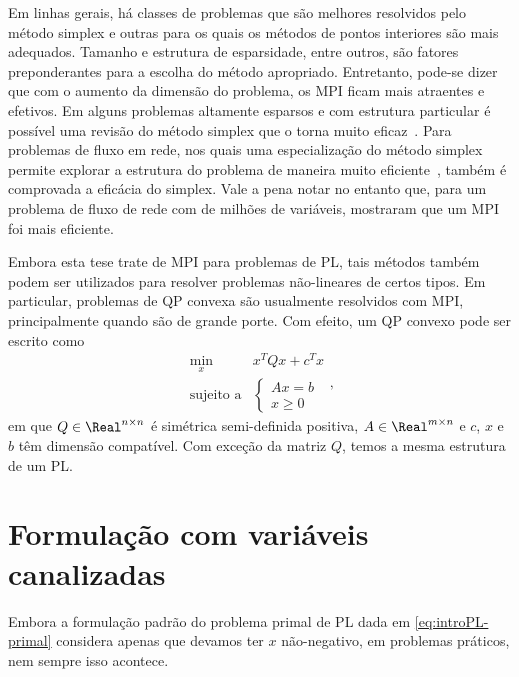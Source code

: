 Em linhas gerais, há classes de problemas que são melhores resolvidos
pelo método simplex e outras para os quais os métodos de pontos interiores são mais
adequados. Tamanho e estrutura de esparsidade, entre outros, são fatores
preponderantes para a escolha do  método apropriado. Entretanto, pode-se dizer
que com o aumento da dimensão do problema, os \ac{MPI} ficam mais atraentes e
efetivos. Em alguns problemas altamente esparsos e com  estrutura particular é possível uma revisão
do método simplex que o torna muito eficaz~\cite{Hall:2005vw}. Para problemas
de fluxo em rede, nos quais uma especialização do método simplex permite
explorar a estrutura do problema de maneira muito
eficiente~\cite{Nemhauser:Integer-and-combinatorial:1988s}, também é comprovada a eficácia do simplex. Vale a pena notar no entanto que, para um problema de fluxo de rede com de milhões de variáveis, 
\textcite{Resende:1993hh} mostraram que um \ac{MPI} foi mais eficiente.



  

Embora esta tese trate de \ac{MPI} para problemas de \ac{PL}, tais
métodos também podem ser utilizados para resolver problemas não-lineares
de certos tipos.
Em particular, problemas de  \ac{QP} convexa
são usualmente resolvidos com \ac{MPI}, principalmente
quando são de grande porte. Com efeito, um \ac{QP} convexo pode ser  escrito como
\begin{equation*}
	\begin{array}{lc}
\displaystyle \min_{x} & x^TQx + c^Tx \\
\text{sujeito a} &\begin{cases} Ax = b \\
				 x \geq 0	
				 \end{cases}
\end{array},
\label{eq:QP}
\end{equation*}
em que $Q\in\Real^{n\times n}$ é simétrica semi-definida positiva, $A\in \Real^{m\times
n}$ e $c$, $x$ e $b$ têm dimensão compatível. Com exceção da matriz $Q$, temos a
mesma estrutura de um \ac{PL}.



\section{Formulação com variáveis canalizadas}

Embora a formulação padrão do problema primal de \ac{PL} dada em \eqref{eq:introPL-primal} considera apenas que devamos ter $x$ não-negativo, em problemas práticos, nem sempre isso acontece. 

